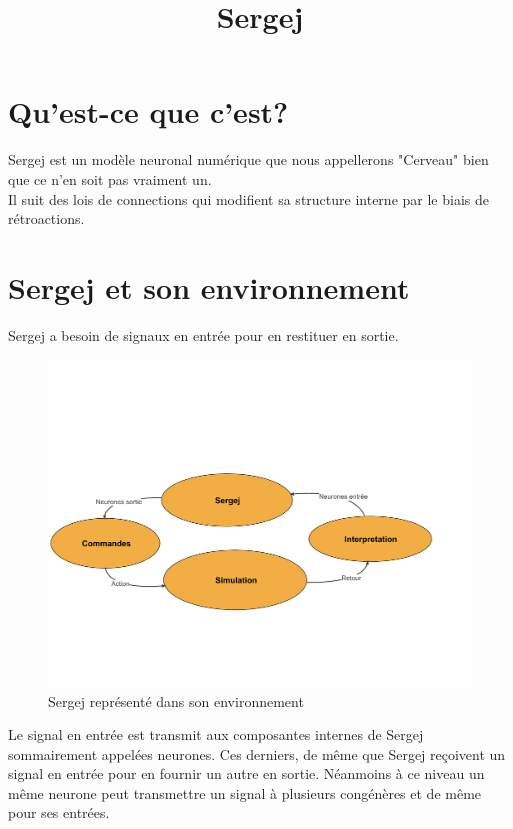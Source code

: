 \documentclass[a4paper]{article}
\title{Sergej}
\begin{document}
\maketitle

\tableofcontents

\newpage

\section{Qu'est-ce que c'est?}

Sergej est un modèle neuronal numérique que nous appellerons "Cerveau" bien que ce n'en soit pas vraiment un.\\
Il suit des lois de connections qui modifient sa structure interne par le biais de rétroactions.

\section{Sergej et son environnement}

Sergej a besoin de signaux en entrée pour en restituer en sortie.
\begin{figure}
\centering
\includegraphics[scale=0.5]{System_commande_diagrame}
\caption{Sergej représenté dans son environnement}
\end{figure}

Le signal en entrée est transmit aux composantes internes de Sergej sommairement appelées neurones. Ces derniers, de même que Sergej reçoivent un signal en entrée pour en fournir un autre en sortie. Néanmoins à ce niveau un même neurone peut transmettre un signal à plusieurs congénères et de même pour ses entrées.
\end{document}
